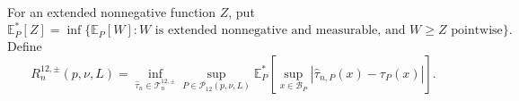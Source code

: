 For an extended nonnegative function \(Z\), put
\[
 \mathbb E_P^*[Z]=\inf\{\mathbb E_P[W]:W\text{ is extended nonnegative and measurable, and }W\geq Z\text{ pointwise}\}.
\]
Define
\[
 R^{12,\pm}_n(p,\nu,L)=
 \inf_{\widehat\tau_n\in\mathcal T^{12,\pm}_n}
 \sup_{P\in\mathcal P_{12}(p,\nu,L)}
 \mathbb E_P^*\left[\sup_{x\in\mathcal B_P}|\widehat\tau_{n,P}(x)-\tau_P(x)|\right].
\]